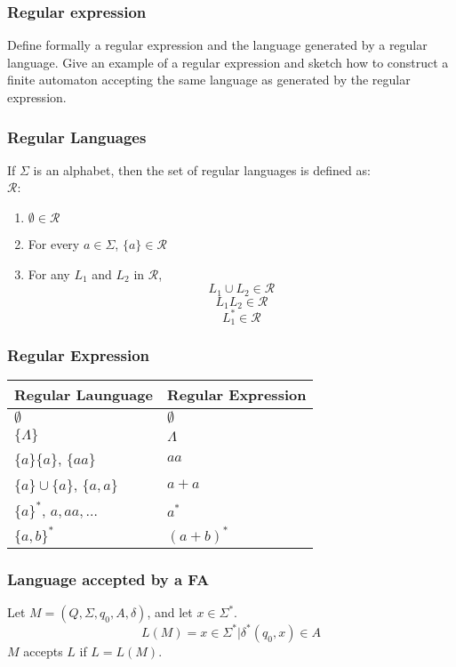 

\begin{frame}
    \frametitle{Regular expression}
    Define formally a regular expression and the language generated by a
    regular language. Give an example of a regular expression and sketch how to
    construct a finite automaton accepting the same language as generated by
    the regular expression.
\end{frame}

\begin{frame}
    \frametitle{Regular Languages}
    If $\Sigma$ is an alphabet, then the set of regular languages is defined
    as:\\
    $\mathcal{R}$:
    \begin{enumerate}
        \item $\emptyset \in \mathcal{R}$
        \item For every $a \in \Sigma$, $\{a\} \in \mathcal{R}$
        \item For any $L_1$ and $L_2$ in $\mathcal{R}$,
            \[L_1 \cup L_2 \in \mathcal{R}\]
            \[L_1 L_2 \in \mathcal{R}\]
            \[L_1^\ast \in \mathcal{R}\]
    \end{enumerate}
\end{frame}

\begin{frame}
    \frametitle{Regular Expression}
    \begin{tabular}{ | l | l |}
        \hline
        \textbf{Regular Launguage}      &   \textbf{Regular Expression} \\
        \hline
        $\emptyset$                     &   $\emptyset$ \\
        $\{\Lambda\}$                   &   $\Lambda$ \\
        $\{a\}\{a\}$, $\{aa\}$          &   $aa$ \\
        $\{a\}\cup\{a\}$, $\{a, a\}$    &   $a + a$ \\
        $\{a\}^\ast$, ${a, aa, \dots}$  &   $a^\ast$ \\
        $\{a, b\}^\ast$                 &   $(a + b)^\ast$
    \end{tabular}
\end{frame}

\begin{frame}
    \frametitle{Language accepted by a FA}
    Let $M = (Q, \Sigma, q_0, A, \delta)$, and let $x \in \Sigma^\ast$.\\
    \[ L(M) = { x \in \Sigma^\ast | \delta^\ast(q_0, x) \in A } \]
    $M$ accepts $L$ if $L = L(M)$.
\end{frame}

